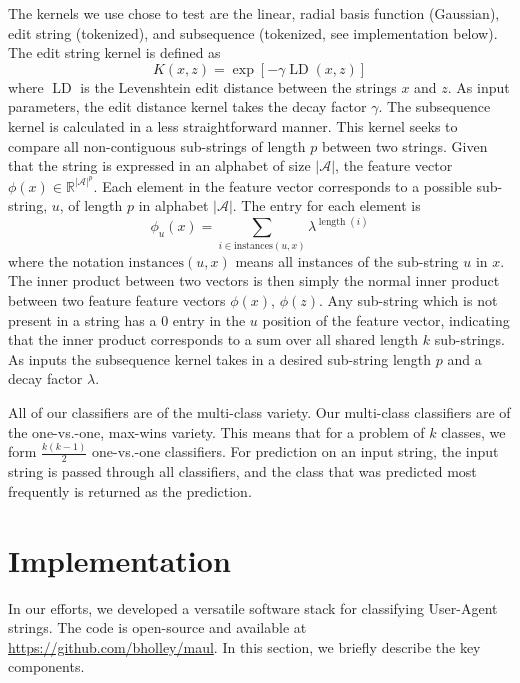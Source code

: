 \documentclass[10pt]{article}
\begin{document}
\begin{multicols}{2}
The kernels we use chose to test are the linear, radial basis function (Gaussian), edit string (tokenized), and subsequence (tokenized, see implementation below).  The edit string kernel is defined as
\begin{equation}
K(x,z) = \exp \left[ - \gamma \operatorname{LD}(x,z) \right]
\end{equation}
where $\operatorname{LD}$ is the Levenshtein edit distance between the strings $x$ and $z$.  As input parameters, the edit distance kernel takes the decay factor $\gamma$.  The subsequence kernel is calculated in a less straightforward manner.  This kernel seeks to compare all non-contiguous sub-strings of length $p$ between two strings.\cite{subseqkernel}  Given that the string is expressed in an alphabet of size $|\mathcal{A}|$, the feature vector $\phi(x) \in \mathbb{R}^{|\mathcal{A}|^p}$.  Each element in the feature vector corresponds to a possible sub-string, $u$, of length $p$ in alphabet $|\mathcal{A}|$.  The entry for each element is 
\begin{equation}\phi_u(x) = \sum_{i \in \text{instances}(u,x)} \lambda^{\operatorname{length}(i)}
\end{equation}
where the notation $ \text{instances}(u,x)$ means all instances of the sub-string $u$ in $x$.  The inner product between two vectors is then simply  the normal inner product between two feature feature vectors $\phi(x)$, $\phi(z)$.  Any sub-string which is not present in a string has a $0$ entry in the $u$ position of the feature vector, indicating that the inner product corresponds to a sum over all shared length $k$ sub-strings.  As inputs the subsequence kernel takes in a desired sub-string length $p$ and a decay factor $\lambda$.

All of our classifiers are of the multi-class variety.  Our multi-class classifiers are of the one-vs.-one, max-wins variety.  This means that for a problem of $k$ classes, we form $\frac{k(k-1)}{2}$ one-vs.-one classifiers.  For prediction on an input string, the input string is passed through all classifiers, and the class that was predicted most frequently is returned as the prediction.  

\section{Implementation}

In our efforts, we developed a  versatile software stack for classifying User-Agent strings. The code is open-source and available at \url{https://github.com/bholley/maul}. In this section, we briefly describe the key components.



\end{multicols}
\end{document}
